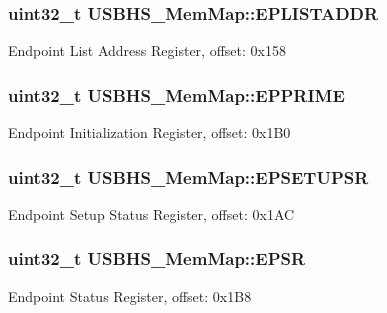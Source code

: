 \subsubsection[{E\+P\+L\+I\+S\+T\+A\+D\+D\+R}]{\setlength{\rightskip}{0pt plus 5cm}uint32\+\_\+t U\+S\+B\+H\+S\+\_\+\+Mem\+Map\+::\+E\+P\+L\+I\+S\+T\+A\+D\+D\+R}\label{struct_u_s_b_h_s___mem_map_a6dcba06cfa08c72f47f505147544a785}
Endpoint List Address Register, offset\+: 0x158 \hypertarget{struct_u_s_b_h_s___mem_map_a15b207ed583494bf9e0ed363c0b974bf}{}
\subsubsection[{E\+P\+P\+R\+I\+M\+E}]{\setlength{\rightskip}{0pt plus 5cm}uint32\+\_\+t U\+S\+B\+H\+S\+\_\+\+Mem\+Map\+::\+E\+P\+P\+R\+I\+M\+E}\label{struct_u_s_b_h_s___mem_map_a15b207ed583494bf9e0ed363c0b974bf}
Endpoint Initialization Register, offset\+: 0x1\+B0 \hypertarget{struct_u_s_b_h_s___mem_map_aaed4061c317598d41086fceed6b848ad}{}
\subsubsection[{E\+P\+S\+E\+T\+U\+P\+S\+R}]{\setlength{\rightskip}{0pt plus 5cm}uint32\+\_\+t U\+S\+B\+H\+S\+\_\+\+Mem\+Map\+::\+E\+P\+S\+E\+T\+U\+P\+S\+R}\label{struct_u_s_b_h_s___mem_map_aaed4061c317598d41086fceed6b848ad}
Endpoint Setup Status Register, offset\+: 0x1\+A\+C \hypertarget{struct_u_s_b_h_s___mem_map_a23262d41b8f4edae108e4c553c81768e}{}
\subsubsection[{E\+P\+S\+R}]{\setlength{\rightskip}{0pt plus 5cm}uint32\+\_\+t U\+S\+B\+H\+S\+\_\+\+Mem\+Map\+::\+E\+P\+S\+R}\label{struct_u_s_b_h_s___mem_map_a23262d41b8f4edae108e4c553c81768e}
Endpoint Status Register, offset\+: 0x1\+B8 \hypertarget{struct_u_s_b_h_s___mem_map_a1da0dd96308b41481bf16c509d8993dc}{}
